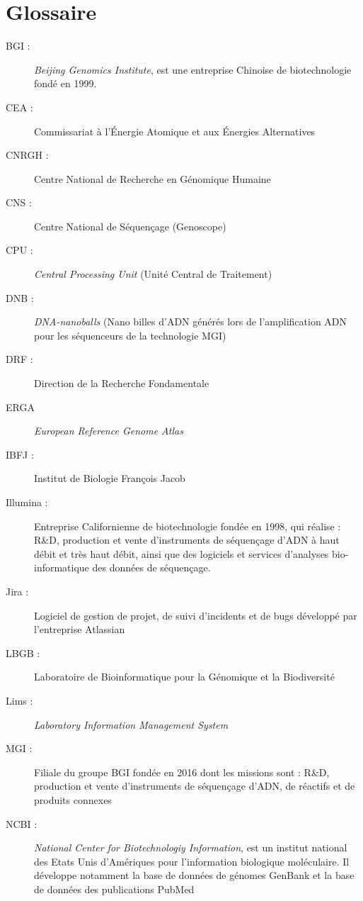 \section*{Glossaire}

\begin{description}
    \item[BGI : ] \emph{Beijing Genomics Institute}, est une entreprise Chinoise de biotechnologie fondé en 1999.
    \item[CEA :] Commissariat à l'Énergie Atomique et aux Énergies Alternatives
    \item[CNRGH :] Centre National de Recherche en Génomique Humaine 
    \item[CNS :] Centre National de Séquençage (Genoscope)
    \item[CPU :] \emph{Central Processing Unit} (Unité Central de Traitement)
    \item[DNB :] \emph{DNA-nanoballs} (Nano \og billes\fg{} d'ADN générés lors de l'amplification ADN pour les séquenceurs de la technologie MGI)
    \item[DRF :] Direction de la Recherche Fondamentale
    \item[ERGA] \emph{European Reference Genome Atlas}
    \item[IBFJ :] Institut de Biologie François Jacob
    \item[Illumina :] Entreprise Californienne de biotechnologie fondée en 1998, qui réalise : R\&D, production et vente d’instruments de séquençage d’ADN à haut débit et très haut débit, ainsi que des logiciels et services d'analyses bio-informatique des données de séquençage.
    \item[Jira :] Logiciel de gestion de projet, de suivi d'incidents et de bugs développé par l'entreprise Atlassian
    \item[LBGB :] Laboratoire de Bioinformatique pour la Génomique et la Biodiversité
    \item[Lims :] \emph{Laboratory Information Management System}
    \item[MGI : ] Filiale du groupe BGI fondée en 2016 dont les missions sont : R\&D, production et vente d’instruments de séquençage 
    d’ADN, de réactifs et de produits connexes
    \item[NCBI :] \emph{National Center for Biotechnologiy Information}, est un institut national des Etats Unis d'Amériques pour l'information biologique moléculaire. Il développe notamment la base de données de génomes GenBank et la base de données des publications PubMed

\end{description}
